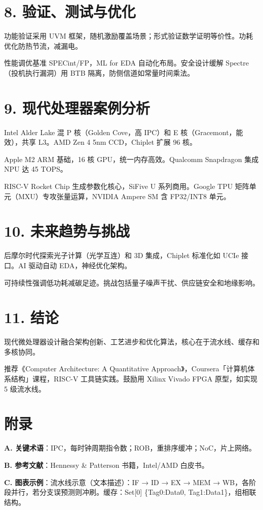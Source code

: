 \chapter{8. 验证、测试与优化}
功能验证采用 UVM 框架，随机激励覆盖场景；形式验证数学证明等价性。功耗优化防热节流，减漏电。\par
性能调优基准 SPECint/FP，ML for EDA 自动化布局。安全设计缓解 Spectre（投机执行漏洞）用 BTB 隔离，防侧信道如常量时间乘法。\par
\chapter{9. 现代处理器案例分析}
Intel Alder Lake 混 P 核（Golden Cove，高 IPC）和 E 核（Gracemont，能效），共享 L3。AMD Zen 4 5nm CCD，Chiplet 扩展 96 核。\par
Apple M2 ARM 基础，16 核 GPU，统一内存高效。Qualcomm Snapdragon 集成 NPU 达 45 TOPS。\par
RISC-V Rocket Chip 生成参数化核心，SiFive U 系列商用。Google TPU 矩阵单元（MXU）专攻张量运算，NVIDIA Ampere SM 含 FP32/INT8 单元。\par
\chapter{10. 未来趋势与挑战}
后摩尔时代探索光子计算（光学互连）和 3D 集成，Chiplet 标准化如 UCIe 接口。AI 驱动自动 EDA，神经优化架构。\par
可持续性强调低功耗减碳足迹。挑战包括量子噪声干扰、供应链安全和地缘影响。\par
\chapter{11. 结论}
现代微处理器设计融合架构创新、工艺进步和优化算法，核心在于流水线、缓存和多核协同。\par
推荐《Computer Architecture: A Quantitative Approach》，Coursera「计算机体系结构」课程，RISC-V 工具链实践。鼓励用 Xilinx Vivado FPGA 原型，如实现 5 级流水线。\par
\chapter{附录}
\textbf{A. 关键术语}：IPC，每时钟周期指令数；ROB，重排序缓冲；NoC，片上网络。\par
\textbf{B. 参考文献}：Hennessy \&{} Patterson 书籍，Intel/AMD 白皮书。\par
\textbf{C. 图表示例}：流水线示意（文本描述）：IF → ID → EX → MEM → WB，各阶段并行，若分支误预测则冲刷。缓存：Set[0] \{{}Tag0:Data0, Tag1:Data1\}{}，组相联结构。\par
